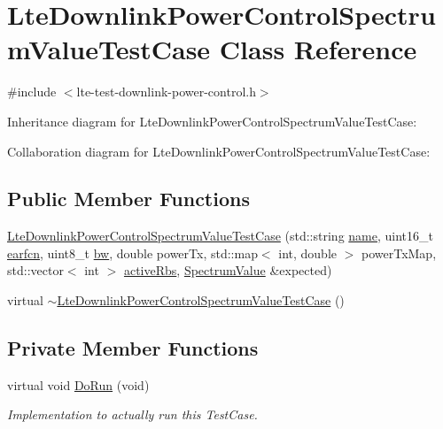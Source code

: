\hypertarget{classLteDownlinkPowerControlSpectrumValueTestCase}{}\section{Lte\+Downlink\+Power\+Control\+Spectrum\+Value\+Test\+Case Class Reference}
\label{classLteDownlinkPowerControlSpectrumValueTestCase}


{\ttfamily \#include $<$lte-\/test-\/downlink-\/power-\/control.\+h$>$}



Inheritance diagram for Lte\+Downlink\+Power\+Control\+Spectrum\+Value\+Test\+Case\+:


Collaboration diagram for Lte\+Downlink\+Power\+Control\+Spectrum\+Value\+Test\+Case\+:
\subsection*{Public Member Functions}
\begin{DoxyCompactItemize}
\item 
\hyperlink{classLteDownlinkPowerControlSpectrumValueTestCase_aeceb7bc5186404a4bf2ff008eb15a4af}{Lte\+Downlink\+Power\+Control\+Spectrum\+Value\+Test\+Case} (std\+::string \hyperlink{generate__test__data__lte__spectrum__model_8m_ab74e6bf80237ddc4109968cedc58c151}{name}, uint16\+\_\+t \hyperlink{generate__test__data__lte__spectrum__value__txpsd_8m_a584be7562abb392609629331f8c6c42c}{earfcn}, uint8\+\_\+t \hyperlink{lte__ue__measurements_8m_a3f7228a3941f19f282647a09dd494528}{bw}, double power\+Tx, std\+::map$<$ int, double $>$ power\+Tx\+Map, std\+::vector$<$ int $>$ \hyperlink{generate__test__data__lte__spectrum__value__txpsd_8m_a24a77723355dffcf07f2679649d46828}{active\+Rbs}, \hyperlink{classns3_1_1SpectrumValue}{Spectrum\+Value} \&expected)
\item 
virtual \hyperlink{classLteDownlinkPowerControlSpectrumValueTestCase_abd513b2292b972e2d5bffbfb6e70349a}{$\sim$\+Lte\+Downlink\+Power\+Control\+Spectrum\+Value\+Test\+Case} ()
\end{DoxyCompactItemize}
\subsection*{Private Member Functions}
\begin{DoxyCompactItemize}
\item 
virtual void \hyperlink{classLteDownlinkPowerControlSpectrumValueTestCase_a98845def4c4141cc1d6383d4392ec4b0}{Do\+Run} (void)
\begin{DoxyCompactList}\small\item\em Implementation to actually run this Test\+Case. \end{DoxyCompactList}\end{DoxyCompactItemize}
